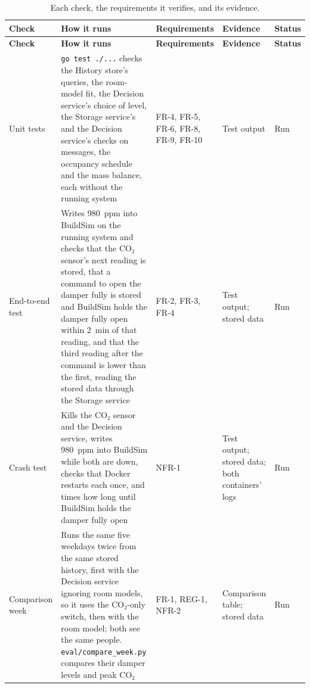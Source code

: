 \documentclass[11pt]{article}
\makeatletter
\newcommand{\reqfield}[2]{\csname req@#1@#2\endcsname}
\newcommand{\req}[1]{\pdftooltip{\hyperlink{req:#1}{#1}}%
  {#1: \reqfield{#1}{text}. Criterion: \reqfield{#1}{criterion}.}}
\def\req#1{#1}}
\makeatother
\begin{document}
\newpage
\begin{longtable}[]{@{}
  >{\raggedright\arraybackslash}p{}
  >{\raggedright\arraybackslash}p{}
  >{\raggedright\arraybackslash}p{}
  >{\raggedright\arraybackslash}p{}
  >{\raggedright\arraybackslash}p{}@{}}
\caption{Each check, the requirements it verifies, and its
evidence.}\label{tab:tests}\\
\toprule
\textbf{Check} & \textbf{How it runs} & \textbf{Requirements}
& \textbf{Evidence} & \textbf{Status} \\
\midrule
\endfirsthead
\toprule
\textbf{Check} & \textbf{How it runs} & \textbf{Requirements}
& \textbf{Evidence} & \textbf{Status} \\
\midrule
\endhead
Unit tests & \texttt{go test ./...} checks the History store's queries,
the room-model fit, the Decision service's choice of level, the Storage service's and the Decision service's checks on messages,
the occupancy schedule and the mass balance, each without the running
system & \req{FR-4}, \req{FR-5}, \req{FR-6}, \req{FR-8}, \req{FR-9}, \req{FR-10} & Test output & Run \\
\midrule
End-to-end test & Writes 980~ppm into BuildSim on the running system and
checks that the CO₂ sensor's next reading is stored, that a command to open the damper fully
is stored and BuildSim holds the damper fully open within 2~min of that reading, and
that the third reading after the command is lower than the first,
reading the stored data through the Storage service
& \req{FR-2}, \req{FR-3}, \req{FR-4} & Test output; stored data & Run \\
\midrule
Crash test & Kills the CO₂ sensor and the Decision service, writes
980~ppm into BuildSim while both are down, checks that Docker restarts
each once, and times how long until BuildSim holds the damper fully open
& \req{NFR-1} & Test output; stored data;
both containers' logs & Run \\
\midrule
Comparison week & Runs the same five weekdays twice from the same stored
history, first with the Decision service ignoring room models, so it
uses the CO₂-only switch, then with the room model; both see the same
people. \texttt{eval/\allowbreak compare\_week.py} compares their
damper levels and peak CO₂ & \req{FR-1}, \req{REG-1}, \req{NFR-2} & Comparison table;
stored data & Run \\

\end{longtable}
\end{document}
